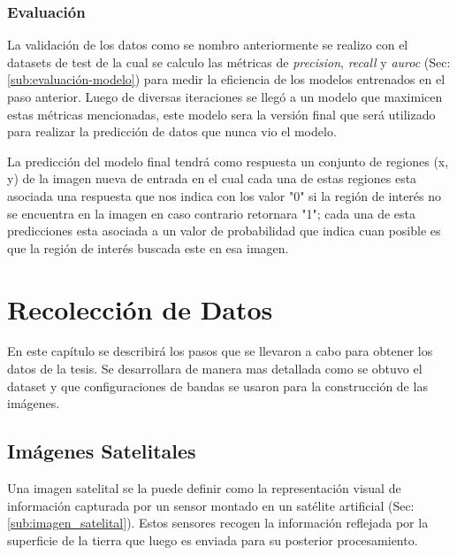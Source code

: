

\subsubsection*{Evaluación}

La validación de los datos como se nombro anteriormente se realizo con el datasets de test de la cual se calculo las métricas de \textit{precision}, \textit{recall} y \textit{auroc} (Sec:\ref{sub:evaluación-modelo}) para medir la eficiencia de los  modelos entrenados en el paso anterior. Luego de diversas iteraciones se llegó a un modelo que maximicen estas métricas mencionadas, este modelo sera la versión final que será utilizado para realizar la predicción de datos que nunca vio el modelo.

La predicción del modelo final tendrá como respuesta un conjunto de regiones (x, y) de la imagen nueva de entrada en el cual cada una de estas regiones esta asociada una respuesta que nos indica con los valor "0" si la región de interés no se encuentra en la imagen en caso contrario  retornara "1"; cada una de esta predicciones esta asociada a un valor de probabilidad que indica cuan posible es que la región de interés buscada este en esa imagen.

\section{Recolección de Datos}\label{sec:recoleccion}

En este capítulo se describirá  los pasos que se llevaron a cabo para obtener los datos de la tesis. Se  desarrollara de manera mas detallada como se obtuvo el dataset y que configuraciones de bandas se usaron para la construcción de las imágenes.


\subsection{Imágenes Satelitales}

Una imagen satelital se la puede definir como la representación visual de información capturada por un sensor montado en un satélite artificial (Sec:\ref{sub:imagen_satelital}). Estos sensores recogen la información reflejada por la superficie de la tierra que luego es enviada para su posterior procesamiento.

